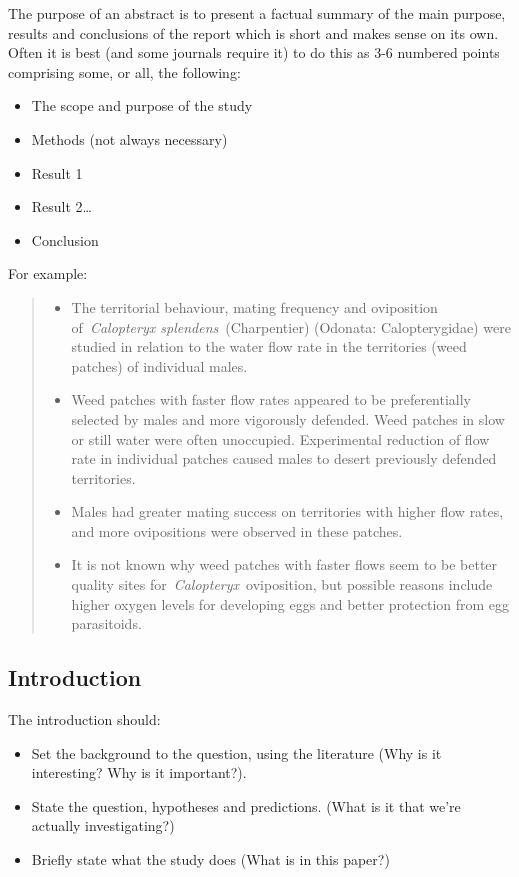 \documentclass[
]{book}
\providecommand{\tightlist}{%
  \setlength{\itemsep}{0pt}\setlength{\parskip}{0pt}}
\begin{document}
The purpose of an abstract is to present a factual summary of the main purpose, results and conclusions of the report which is short and makes sense on its own. Often it is best (and some journals require it) to do this as 3-6 numbered points comprising some, or all, the following:

\begin{itemize}
\tightlist
\item
  The scope and purpose of the study
\item
  Methods (not always necessary)
\item
  Result 1
\item
  Result 2\ldots{}
\item
  Conclusion
\end{itemize}

For example:

\begin{quote}
\begin{itemize}
\tightlist
\item
  The territorial behaviour, mating frequency and oviposition of~\emph{Calopteryx splendens}~(Charpentier) (Odonata: Calopterygidae) were studied in relation to the water flow rate in the territories (weed patches) of individual males.
\item
  Weed patches with faster flow rates appeared to be preferentially selected by males and more vigorously defended. Weed patches in slow or still water were often unoccupied. Experimental reduction of flow rate in individual patches caused males to desert previously defended territories.
\item
  Males had greater mating success on territories with higher flow rates, and more ovipositions were observed in these patches.
\item
  It is not known why weed patches with faster flows seem to be better quality sites for~\emph{Calopteryx}~oviposition, but possible reasons include higher oxygen levels for developing eggs and better protection from egg parasitoids.
\end{itemize}
\end{quote}

\hypertarget{introduction-8}{%
\subsection{Introduction}\label{introduction-8}}

The introduction should:

\begin{itemize}
\tightlist
\item
  Set the background to the question, using the literature (Why is it interesting? Why is it important?).
\item
  State the question, hypotheses and predictions. (What is it that we're actually investigating?)
\item
  Briefly state what the study does (What is in this paper?)
\end{itemize}
\end{document}
